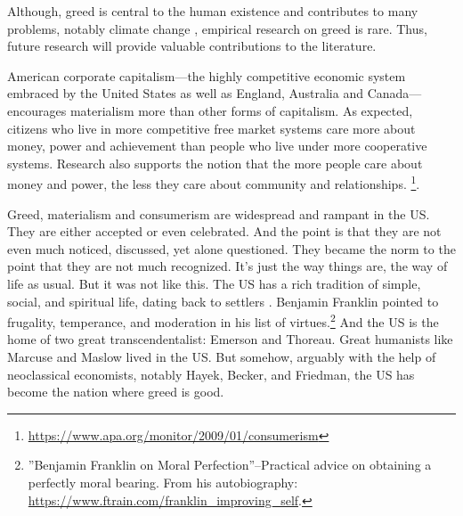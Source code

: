\documentclass[10pt, letterpaper]{article}
\begin{document}
\begin{spacing}{1.8}
Although, greed is central to the human existence and contributes to many problems, notably climate change \citep[e.g.,][]{okulicz19}, empirical research on greed is rare. Thus, future research will provide valuable contributions to the literature. 


American corporate capitalism---the highly competitive economic system embraced by the United States as well as England, Australia and Canada---encourages
materialism more than other forms of capitalism.
%
As expected, citizens who live in more competitive free market systems care more about money, power and achievement than people who live under more cooperative systems. Research also supports the notion that the more people care about money and power, the less they care about community and relationships.
\footnote{\url{https://www.apa.org/monitor/2009/01/consumerism}}.

Greed, materialism and consumerism are widespread and rampant in the US. They
are either accepted or even celebrated. And the point is that they are not even
much noticed, discussed, yet alone questioned. They became the norm to the point
that they are not much recognized. It's just the way things are, the way of life
as usual. But it was not like this. The  US has a rich tradition of simple,
social, and spiritual life, dating back to settlers \cite{fischer91}. Benjamin
Franklin pointed to frugality, temperance, and moderation in his list of
virtues.\footnote{''Benjamin Franklin on Moral Perfection''--Practical advice on
  obtaining a perfectly moral bearing. From his autobiography:
  \url{https://www.ftrain.com/franklin_improving_self}.} And the
US is the home of two great transcendentalist: Emerson and Thoreau. Great humanists like Marcuse and Maslow lived in the
US. But somehow, arguably with the help of neoclassical economists, notably
Hayek, Becker, and Friedman, the US has become the nation where greed is good.


\end{spacing}
\end{document}
